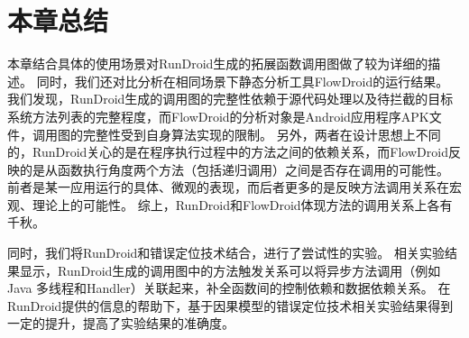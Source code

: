 	



\section{本章总结}
	



本章结合具体的使用场景对RunDroid生成的拓展函数调用图做了较为详细的描述。
同时，我们还对比分析在相同场景下静态分析工具FlowDroid的运行结果。
我们发现，RunDroid生成的调用图的完整性依赖于源代码处理以及待拦截的目标系统方法列表的完整程度，而FlowDroid的分析对象是Android应用程序APK文件，调用图的完整性受到自身算法实现的限制。
另外，两者在设计思想上不同的，RunDroid关心的是在程序执行过程中的方法之间的依赖关系，而FlowDroid反映的是从函数执行角度两个方法（包括递归调用）之间是否存在调用的可能性。
前者是某一应用运行的具体、微观的表现，而后者更多的是反映方法调用关系在宏观、理论上的可能性。
综上，RunDroid和FlowDroid体现方法的调用关系上各有千秋。

同时，我们将RunDroid和错误定位技术结合，进行了尝试性的实验。
相关实验结果显示，RunDroid生成的调用图中的方法触发关系可以将异步方法调用（例如Java 多线程和Handler）关联起来，补全函数间的控制依赖和数据依赖关系。
在RunDroid提供的信息的帮助下，基于因果模型的错误定位技术相关实验结果得到一定的提升，提高了实验结果的准确度。


